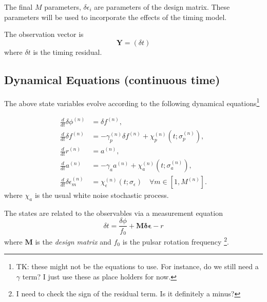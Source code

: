 \documentclass[]{scrartcl}
\begin{document}
\noindent The final $M$ parameters, $\delta \epsilon_i$ are parameters of the design matrix. These parameters will be used to incorporate the effects of the timing model. \newline 



\noindent The observation vector is 
\begin{equation}
	\boldsymbol{Y} = \left(\delta t \right)
\end{equation}
where $\delta t$ is the timing residual.


\subsection{Dynamical Equations (continuous time)}

The above state variables evolve according to the following dynamical equations\footnote{TK: these might not be the equations to use. For instance, do we still need a $\gamma$ term? I just use these as place holders for now.}


\begin{align}
	\frac{d}{dt} \delta \phi^{(n)} &= \delta f^{(n)}, \\
	\frac{d}{dt} \delta f^{(n)} &= -\gamma_p^{(n)} \delta f^{(n)} + \chi_p^{(n)}(t;\sigma_p^{(n)}), \\
	\frac{d}{dt} r^{(n)} &= a^{(n)}, \\
	\frac{d}{dt} a^{(n)} &= -\gamma_a a^{(n)} + \chi_a^{(n)}(t;\sigma_a^{(n)}), \\
	\frac{d}{dt} \delta \epsilon^{(n)}_{m} &= \chi_\epsilon^{(n)}(t;\sigma_\epsilon) \quad \forall m \in [1, M^{(n)}].
\end{align}
where $\chi_a$ is the usual white noise stochastic process. \newline 



\noindent The states are related to the observables via a measurement equation
\begin{equation}
	\delta t = \frac{\delta \phi}{f_0} + \mathbf{M} \mathbf{\delta \epsilon} - r
\end{equation}
where  $\mathbf{M}$ is the \textit{design matrix} and $f_0$ is the pulsar rotation frequency \footnote{I need to check the sign of the residual term. Is it definitely a minus?}. \newline 
\end{document}

